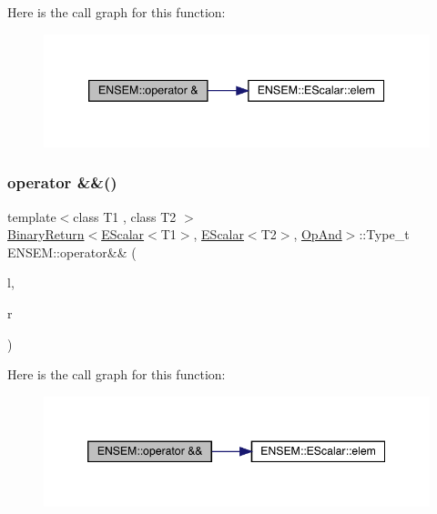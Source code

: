 Here is the call graph for this function\+:
\nopagebreak
\begin{figure}[H]
\begin{center}
\leavevmode
\includegraphics[width=339pt]{d4/dca/group__escalar_ga445352dd6ecea4dcb57bfd1abcda2a0b_cgraph}
\end{center}
\end{figure}
\mbox{\label{group__escalar_ga8ca8cd66f3b104a6439afa608f4a6e50}} 
\subsubsection{\texorpdfstring{operator \&\&()}{operator \&\&()}}
{\footnotesize\ttfamily template$<$class T1 , class T2 $>$ \\
\mbox{\hyperlink{structENSEM_1_1BinaryReturn}{Binary\+Return}}$<$\mbox{\hyperlink{classENSEM_1_1EScalar}{E\+Scalar}}$<$T1$>$, \mbox{\hyperlink{classENSEM_1_1EScalar}{E\+Scalar}}$<$T2$>$, \mbox{\hyperlink{structENSEM_1_1OpAnd}{Op\+And}}$>$\+::Type\+\_\+t E\+N\+S\+E\+M\+::operator\&\& (\begin{DoxyParamCaption}\item[{const \mbox{\hyperlink{classENSEM_1_1EScalar}{E\+Scalar}}$<$ T1 $>$ \&}]{l,  }\item[{const \mbox{\hyperlink{classENSEM_1_1EScalar}{E\+Scalar}}$<$ T2 $>$ \&}]{r }\end{DoxyParamCaption})\hspace{0.3cm}{\ttfamily [inline]}}

Here is the call graph for this function\+:
\nopagebreak
\begin{figure}[H]
\begin{center}
\leavevmode
\includegraphics[width=346pt]{d4/dca/group__escalar_ga8ca8cd66f3b104a6439afa608f4a6e50_cgraph}
\end{center}
\end{figure}
\mbox{\label{group__escalar_ga248e30ef2d97325ac4b11c077bc514dd}} 
